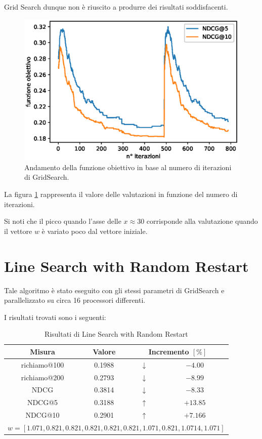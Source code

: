 Grid Search dunque non è riuscito a produrre dei risultati soddisfacenti.
\pagebreak

\begin{figure}[h!]
	\centering
	\includegraphics[width=0.7\linewidth]{figure/gs_search}
	\caption[Andamento della funzione obiettivo utilizzando GridSearch]{Andamento della funzione obiettivo in base al numero di iterazioni di GridSearch.}
	\label{fig:gssearch}
\end{figure}

La figura \ref{fig:gssearch} rappresenta il valore delle valutazioni in funzione del numero di iterazioni.

Si noti che il picco quando l'asse delle $x \approx 30$ corrisponde alla valutazione quando il vettore $w$ è variato
poco dal vettore iniziale.

\newpage

\section{Line Search with Random Restart}

Tale algoritmo è stato eseguito con gli stessi parametri di GridSearch e parallelizzato
su circa 16 processori differenti.

I risultati trovati sono i seguenti:

\begin{table}[h!]
	\centering
	\begin{tabular}{|c|c|c|c|}
		\hline
		\textbf{Misura} & \textbf{Valore} & \multicolumn{2}{|c|}{\textbf{Incremento} $\left[\%\right]$} \\
		\hline
		richiamo@100 &  0.1988 & $\downarrow$ & $-4.00$   \\
		\hline
		richiamo@200 & 0.2793  & $\downarrow$ & $-8.99$ \\
		\hline
		NDCG & 0.3814 & $\downarrow$ & $-8.33$\\
		\hline
		NDCG@5 & 0.3188 & $\uparrow$ & $+13.85$ \\
		\hline
		NDCG@10 & 0.2901 & $\uparrow$ & $+7.166$ \\
		\hline
		\multicolumn{4}{|c|}{
			$w = [1.071, 0.821, 0.821, 0.821, 0.821, 0.821, 1.071, 0.821, 1.0714, 1.071]$ 
		} \\
	\hline
	\end{tabular}
	\caption{Risultati di Line Search with Random Restart}
\end{table}

